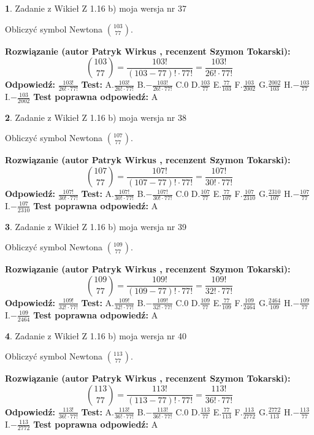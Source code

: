\documentclass[12pt, a4paper]{article}
\theoremstyle{definition} %
\newtheorem{zad}{}
\newcommand{\zadStart}[1]{\begin{zad}#1\newline}
\newcommand{\zadStop}{\end{zad}}
\newcommand{\rozwStart}[2]{\noindent \textbf{Rozwiązanie (autor #1 , recenzent #2): }\newline}
\newcommand{\rozwStop}{\newline}
\newcommand{\odpStart}{\noindent \textbf{Odpowiedź:}\newline}
\newcommand{\odpStop}{\newline}
\newcommand{\testStart}{\noindent \textbf{Test:}\newline}
\newcommand{\testStop}{\newline}
\newcommand{\kluczStart}{\noindent \textbf{Test poprawna odpowiedź:}\newline}
\newcommand{\kluczStop}{\newline}
\begin{document}
\zadStart{Zadanie z Wikieł Z 1.16 b) moja wersja nr 37}

Obliczyć symbol Newtona ${103 \choose 77}$.
\zadStop
\rozwStart{Patryk Wirkus}{Szymon Tokarski}
$${103 \choose 77} = \frac{103!}{(103-77)! \cdot 77!} = \frac{103!}{26! \cdot 77!}$$
\rozwStop
\odpStart
$\frac{103!}{26! \cdot 77!}$
\odpStop
\testStart
A.$\frac{103!}{26! \cdot 77!}$ B.$-\frac{103!}{26! \cdot 77!}$ C.$0$ D.$\frac{103}{77}$ E.$\frac{77}{103}$
F.$\frac{103}{2002}$ G.$\frac{2002}{103}$
H.$-\frac{103}{77}$
I.$-\frac{103}{2002}$
\testStop
\kluczStart
A
\kluczStop



\zadStart{Zadanie z Wikieł Z 1.16 b) moja wersja nr 38}

Obliczyć symbol Newtona ${107 \choose 77}$.
\zadStop
\rozwStart{Patryk Wirkus}{Szymon Tokarski}
$${107 \choose 77} = \frac{107!}{(107-77)! \cdot 77!} = \frac{107!}{30! \cdot 77!}$$
\rozwStop
\odpStart
$\frac{107!}{30! \cdot 77!}$
\odpStop
\testStart
A.$\frac{107!}{30! \cdot 77!}$ B.$-\frac{107!}{30! \cdot 77!}$ C.$0$ D.$\frac{107}{77}$ E.$\frac{77}{107}$
F.$\frac{107}{2310}$ G.$\frac{2310}{107}$
H.$-\frac{107}{77}$
I.$-\frac{107}{2310}$
\testStop
\kluczStart
A
\kluczStop



\zadStart{Zadanie z Wikieł Z 1.16 b) moja wersja nr 39}

Obliczyć symbol Newtona ${109 \choose 77}$.
\zadStop
\rozwStart{Patryk Wirkus}{Szymon Tokarski}
$${109 \choose 77} = \frac{109!}{(109-77)! \cdot 77!} = \frac{109!}{32! \cdot 77!}$$
\rozwStop
\odpStart
$\frac{109!}{32! \cdot 77!}$
\odpStop
\testStart
A.$\frac{109!}{32! \cdot 77!}$ B.$-\frac{109!}{32! \cdot 77!}$ C.$0$ D.$\frac{109}{77}$ E.$\frac{77}{109}$
F.$\frac{109}{2464}$ G.$\frac{2464}{109}$
H.$-\frac{109}{77}$
I.$-\frac{109}{2464}$
\testStop
\kluczStart
A
\kluczStop



\zadStart{Zadanie z Wikieł Z 1.16 b) moja wersja nr 40}

Obliczyć symbol Newtona ${113 \choose 77}$.
\zadStop
\rozwStart{Patryk Wirkus}{Szymon Tokarski}
$${113 \choose 77} = \frac{113!}{(113-77)! \cdot 77!} = \frac{113!}{36! \cdot 77!}$$
\rozwStop
\odpStart
$\frac{113!}{36! \cdot 77!}$
\odpStop
\testStart
A.$\frac{113!}{36! \cdot 77!}$ B.$-\frac{113!}{36! \cdot 77!}$ C.$0$ D.$\frac{113}{77}$ E.$\frac{77}{113}$
F.$\frac{113}{2772}$ G.$\frac{2772}{113}$
H.$-\frac{113}{77}$
I.$-\frac{113}{2772}$
\testStop
\kluczStart
A
\kluczStop
\end{document}
